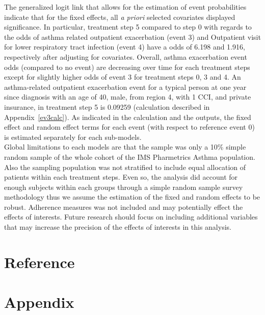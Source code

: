 \documentclass[10pt,a4paper,fleqn]{article}
\begin{document}
{The generalized logit link that allows for the estimation of event probabilities indicate that for the fixed effects, all \textit{a priori} selected covariates displayed significance. In particular, treatment step 5 compared to step 0 with regards to the odds of asthma related outpatient exacerbation (event 3) and Outpatient visit for lower respiratory tract infection (event 4) have a odds of 6.198 and 1.916, respectively after adjusting for covariates. Overall, asthma exacerbation event odds (compared to no event) are decreasing over time for each treatment steps except for slightly higher odds of event 3 for treatment steps 0, 3 and 4. An asthma-related outpatient exacerbation event for a typical person at one year since diagnosis with an age of 40, male, from region 4, with 1 CCI, and private insurance, in treatment step 5 is 0.09259 (calculation described in Appendix~\ref{ev3calc}). As indicated in the calculation and the outputs, the fixed effect and random effect terms for each event (with respect to reference event 0) is estimated separately for each sub-models.\\
Global limitations to each models are that the sample was only a 10\% simple random sample of the whole cohort of the IMS Pharmetrics Asthma population. Also the sampling population was not stratified to include equal allocation of patients within each treatment steps. Even so, the analysis did account for enough subjects within each groups through a simple random sample survey methodology thus we assume the estimation of the fixed and random effects to be robust\cite{brewer1979class}. Adherence measures was not included and may potentially effect the effects of interests\cite{dimatteo2002patient}. Future research should focus on including additional variables that may increase the precision of the effects of interests in this analysis. 

\newpage
\section{Reference}
\printbibliography[title={Articles},type=article,sorting=none,heading=subbibliography]
\printbibliography[title={Books},type=incollection,sorting=none,heading=subbibliography]






\newpage


\section{Appendix}
}
\end{document}
